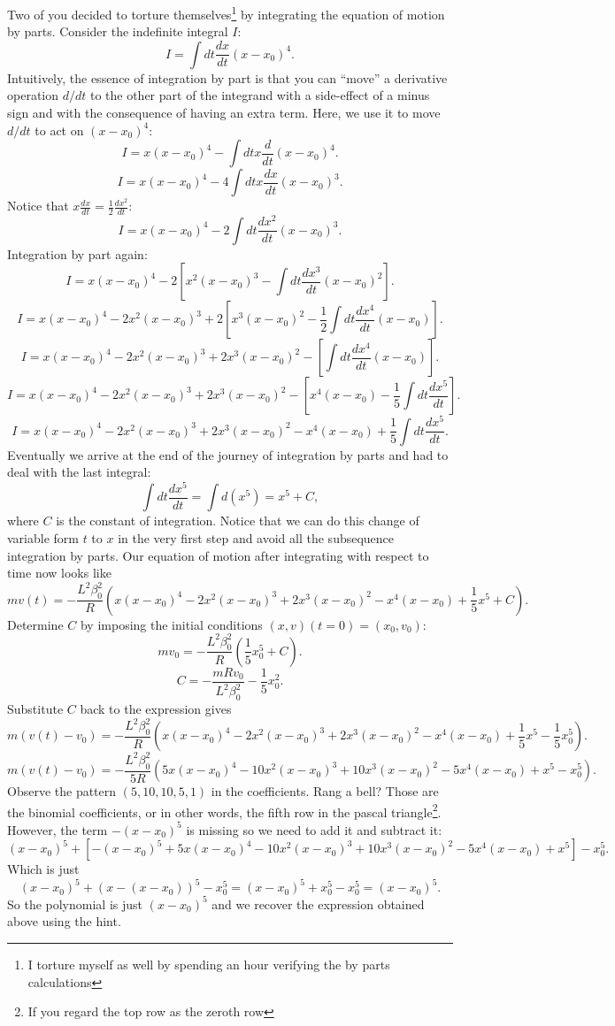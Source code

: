\documentclass[a4paper]{article}
\begin{document}
Two of you decided to torture themselves\footnote{I torture myself as well by spending an hour verifying the by parts calculations} by integrating the equation of motion by parts. 
Consider the indefinite integral $I$:
 \[
     I = \int dt \frac{dx}{dt} (x-x_0)^4 
.\] 
Intuitively, the essence of integration by part is that you can ``move'' a derivative operation $d/dt$ to the other part of the integrand with a side-effect of a minus sign and with the consequence of having an extra term. Here, we use it to move $d/dt$ to act on $(x-x_0)^4$:
\[
    I = x(x-x_0)^4 - \int dt x \frac{d}{dt} (x-x_0)^4
.\] 
\[
    I = x(x-x_0)^4 - 4 \int dt x \frac{dx}{dt} (x-x_0)^3 
.\] 
Notice that $x \frac{dx}{dt} = \frac{1}{2} \frac{dx^2}{dt}$:
\[
    I = x(x-x_0)^4 - 2 \int dt \frac{dx^2}{dt} (x-x_0)^3 
.\]
Integration by part again:
\[
    I = x(x-x_0)^4 - 2 \left[ x^2 (x-x_0)^3 -  \int dt \frac{dx^3}{dt} (x-x_0)^2 \right]
.\] 
\[
    I = x(x-x_0)^4 - 2 x^2 (x-x_0)^3 + 2 \left[ x^3 (x-x_0)^2 - \frac{1}{2} \int dt \frac{dx^4}{dt} (x-x_0) \right]
.\] 
\[
    I = x(x-x_0)^4 - 2 x^2 (x-x_0)^3 + 2  x^3 (x-x_0)^2 - \left[ \int dt \frac{dx^4}{dt} (x-x_0) \right]
.\] 
\[
    I = x(x-x_0)^4 - 2 x^2 (x-x_0)^3 + 2  x^3 (x-x_0)^2 - \left[ x^4 (x-x_0) - \frac{1}{5}\int dt \frac{dx^5}{dt} \right]
.\]
\[
    I = x(x-x_0)^4 - 2 x^2 (x-x_0)^3 + 2  x^3 (x-x_0)^2 - x^4 (x-x_0) + \frac{1}{5}\int dt \frac{dx^5}{dt} 
.\] 
Eventually we arrive at the end of the journey of integration by parts and had to deal with the last integral:
\[
    \int dt \frac{dx^5}{dt} = \int d(x^5) = x^5 + C 
,\]
where $C$ is the constant of integration. Notice that we can do this change of variable form $t$ to  $x$ in the very first step and avoid all the subsequence integration by parts. 
Our equation of motion after integrating with respect to time now looks like
\[
    m v(t) = -\frac{L^2 \beta_0^2}{R} \left(x(x-x_0)^4 - 2 x^2 (x-x_0)^3 + 2  x^3 (x-x_0)^2 - x^4 (x-x_0) + \frac{1}{5} x^5 + C \right)
.\] 
Determine $C$ by imposing the initial conditions $(x,v)(t=0) = (x_0, v_0)$:
\[
    m v_0 = -\frac{L^2 \beta_0^2}{R} \left( \frac{1}{5} x_0^5 + C\right) 
.\] 
\[
C = - \frac{mRv_0}{L^2\beta_0^2} - \frac{1}{5} x_0^2
.\] 
Substitute $C$ back to the expression gives
 \[
     m (v(t)-v_0) = -\frac{L^2 \beta_0^2}{R} \left(  x(x-x_0)^4 - 2 x^2 (x-x_0)^3 + 2  x^3 (x-x_0)^2 - x^4 (x-x_0) + \frac{1}{5} x^5 -\frac{1}{5}x_0^5 \right)
.\] 
\[
     m (v(t)-v_0) = -\frac{L^2 \beta_0^2}{5R} \left(5 x(x-x_0)^4 - 10 x^2 (x-x_0)^3 + 10 x^3 (x-x_0)^2 - 5 x^4 (x-x_0) +  x^5 - x_0^5 \right)
.\] 
Observe the pattern $(5, 10, 10, 5, 1)$ in the coefficients. Rang a bell? Those are the binomial coefficients, or in other words, the fifth row in the pascal triangle\footnote{If you regard the top row as the zeroth row}. However, the term $-(x-x_0)^5$ is missing so we need to add it and subtract it:
\[
    (x-x_0)^5 + \left[- (x-x_0)^5 + 5 x(x-x_0)^4 - 10 x^2 (x-x_0)^3 + 10 x^3 (x-x_0)^2 - 5 x^4 (x-x_0) +  x^5 \right] - x_0^5 
.\] 
Which is just
\[
    (x-x_0)^5 + (x-(x-x_0))^5 - x_0^5 = (x-x_0)^5 + x_0^5 - x_0^5 = (x-x_0)^5
.\] 
So the polynomial is just $(x-x_0)^5$ and we recover the expression obtained above using the hint.
\end{document}

